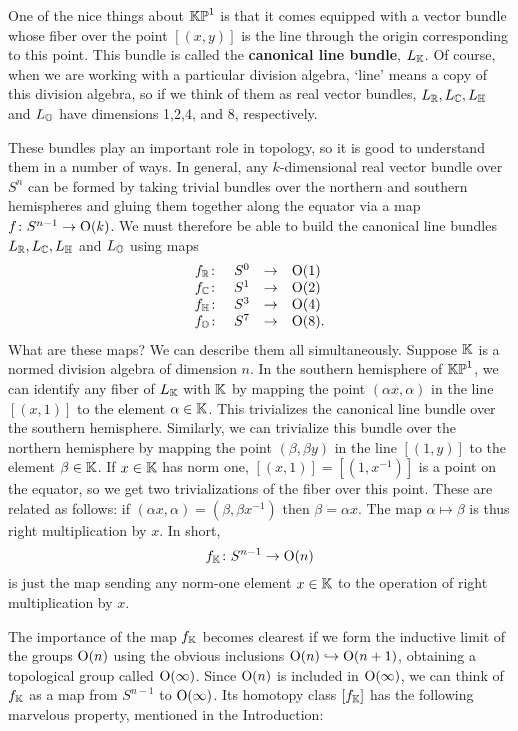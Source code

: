 One of the nice things about ${\mathbb {KP}}^1$ is that it comes equipped with a 
vector bundle whose fiber over the point $[(x,y)]$ is the line 
through the origin corresponding to this point.  This bundle is called 
the {\bf canonical line bundle}, $L_{\mathbb K}$.  Of course, when we are working 
with a particular division algebra, `line' means a copy of this division 
algebra, so if we think of them as real vector bundles, $L_{\mathbb R}, L_{\mathbb C}, 
L_{\mathbb H}$ and $L_{\mathbb O}$ have dimensions 1,2,4, and 8, respectively.   

These bundles play an important role in topology, so it is good to
understand them in a number of ways.  In general, any $k$-dimensional
real vector bundle over $S^n$ can be formed by taking trivial bundles
over the northern and southern hemispheres and gluing  them together
along the equator via a map $f \colon S^{n-1} \to {\rm O}(k)$.  We must
therefore be able to build the canonical line bundles $L_{\mathbb R}, L_{\mathbb C},
L_{\mathbb H}$ and $L_{\mathbb O}$ using maps  
\[  
\begin{array}{cccl}       
          f_{\mathbb R} \colon &S^0& \to & {\rm O}(1)   \\  
          f_{\mathbb C} \colon &S^1& \to & {\rm O}(2)   \\  
          f_{\mathbb H} \colon &S^3& \to & {\rm O}(4)   \\  
          f_{\mathbb O} \colon &S^7& \to & {\rm O}(8).        
\end{array}   
\]  
What are these maps?  We can describe them all simultaneously.  Suppose  
${\mathbb K}$ is a normed division algebra of dimension $n$.  In the southern  
hemisphere of ${\mathbb {KP}}^1$, we can identify any fiber of $L_{\mathbb K}$  with ${\mathbb K}$ by 
mapping the point $(\alpha x, \alpha)$ in the line $[(x,1)]$ to the 
element $\alpha \in {\mathbb K}$.  This trivializes the canonical line bundle 
over the southern hemisphere.  Similarly, we can trivialize this bundle 
over the northern hemisphere by mapping the point $(\beta,\beta y)$ in 
the line $[(1,y)]$ to the element $\beta \in {\mathbb K}$.  If $x \in {\mathbb K}$ has norm 
one, $[(x,1)] = [(1,x^{-1})]$ is a point on the equator, so we get two 
trivializations of the fiber over this point.  These are related as 
follows: if $(\alpha x, \alpha) =  (\beta, \beta x^{-1})$ then $\beta = 
\alpha x$.  The map $\alpha \mapsto \beta$ is thus right multiplication 
by $x$.  In short,   
\[       f_{\mathbb K} \colon S^{n-1} \to {\rm O}(n)  \]  
is just the map sending any norm-one element $x \in {\mathbb K}$ to the operation 
of right multiplication by $x$.   
 
The importance of the map $f_{\mathbb K}$ becomes clearest if we form the 
inductive limit of the groups ${\rm O}(n)$ using the obvious inclusions 
${\rm O}(n) \hookrightarrow {\rm O}(n+1)$, obtaining a topological group 
called ${\rm O}(\infty)$.  Since ${\rm O}(n)$ is included in ${\rm O}(\infty)$, 
we can think of $f_{\mathbb K}$ as a map from $S^{n-1}$ to ${\rm O}(\infty)$.
Its homotopy class $[f_{\mathbb K}]$ has the following marvelous property,
mentioned in the Introduction:

